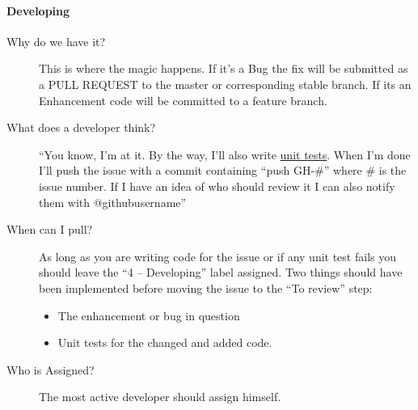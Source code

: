 \documentclass[letterpaper,10pt,english]{sphinxmanual}
\begin{document}
\paragraph{Developing}
\label{bugtracker/kanban:developing}\begin{description}
\item[{Why do we have it?}] \leavevmode
This is where the magic happens. If it’s a Bug the fix will be submitted as a
PULL REQUEST to the master or corresponding stable branch. If its an
Enhancement code will be committed to a feature branch.

\item[{What does a developer think?}] \leavevmode
``You know, I’m at it. By the way, I’ll also write \href{https://github.com/owncloud/core/tree/master/tests}{unit tests}. When I’m done
I’ll push the issue with a commit containing ``push GH-\#'' where \# is the issue
number. If I have an idea of who should review it I can also notify them with
@githubusername''

\item[{When can I pull?}] \leavevmode
As long as you are writing code for the issue or if any unit test fails you
should leave the “4 – Developing” label assigned. Two things should have been
implemented before moving the issue to the “To review” step:
\begin{itemize}
\item {} 
The enhancement or bug in question

\item {} 
Unit tests for the changed and added code.

\end{itemize}

\item[{Who is Assigned?}] \leavevmode
The most active developer should assign himself.

\end{description}
\end{document}
